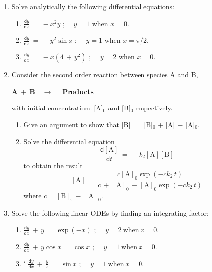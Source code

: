 \documentclass[11pt,a4paper]{article}
\newcommand{\dif}{\mathsf{d}}
\def\bA{\mathbf{A}}
\def\bB{\mathbf{B}}
\def\tough{$\!\!\!{}^\star\>$}
\begin{document}
\begin{enumerate}


\item\label{q1188} Solve analytically the following differential equations:
	\begin{enumerate}
	\item $\displaystyle{ \frac{\dif y}{\dif x}\,=\, -x^2y}$ ; \ \  $y=1$ when $x=0$.
	\item $\displaystyle{ \frac{\dif y}{\dif x}\,=\, -y^2\sin x}$ ; \ \  $y=1$ when $x=\pi/2$.
	\item $\displaystyle{ \frac{\dif y}{\dif x}\,=\, -x(4\,+\,y^2)}$ ; \ \ $y=2$ when $x=0$.
	\end{enumerate}


%

\item\label{1189} Consider the second order reaction between species A and B,

\begin{center}
$\bA \> + \> \bB \quad \longrightarrow\quad$ {\bf Products}

\end{center}

with initial concentrations [A]$_0$ and [B]$_0$ respectively.

	\begin{enumerate}
	\item Give an argument to show that
	[B]$\,=\,$ [B]$_0$ + [A]$\,-\,$[A]$_0$.
	\item Solve the differential equation \[ \frac{\dif \mathrm{[A]}}{\dif t}\,=\, -k_2 \mathrm{[A][B]}\]
	to obtain the result
	\[\mathrm{[A]}\,=\,\frac{c\mathrm{[A]_0}\exp{(-ck_2\,t)}}{c\,+\,
\mathrm{[A]_0}\,-\,\mathrm{[A]_0}\exp(-ck_2\,t)}\] where $c= \mathrm{[B]}_0\,-\,\mathrm{[A]_0}$.
	\end{enumerate}


%
	


\item\label{q1193} 
Solve the following linear ODEs by finding an  integrating factor:
	\begin{enumerate}
	\item  $\displaystyle{ \frac{\dif y}{\dif x}\,+\,y\,=\,\exp{(-x)}}$ ; \ \  $y=2\> \mathrm{when} \> x=0$.
	\item  $\displaystyle{ \frac{\dif y}{\dif x}\,+\,y \cos x\,=\,\cos{x}}$ ; \ \  $y=1\> \mathrm{when} \> x=0$.
	\item\tough  $\displaystyle{ \frac{\dif y}{\dif x}\,+\,\frac{y}{x}\,=\,\sin{x}}$ ; \ \ $y=1\> \mathrm{when} \>x=0$.
	\end{enumerate}


\end{enumerate}
\end{document}
